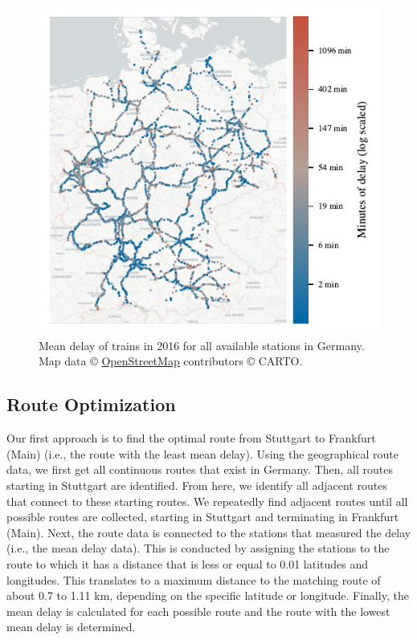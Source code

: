 \documentclass{article}
\theoremstyle{plain}
\theoremstyle{definition}
\theoremstyle{remark}
\begin{document}
	\begin{figure} %
		\begin{center}
			\includegraphics{./fig/maps_KI_01_all_data_cmap.pdf} %
		\end{center}
		\caption{Mean delay of trains in 2016 for all available stations in Germany. Map data © \href{https://www.openstreetmap.org/}{OpenStreetMap} contributors © CARTO.}
		\label{all_data_cmap}
	\end{figure}
	
	\subsection{Route Optimization}\label{sec:methods_route}
	
	Our first approach is to find the optimal route from Stuttgart to Frankfurt (Main) (i.e., the route with the least mean delay). Using the geographical route data, we first get all continuous routes that exist in Germany. Then, all routes starting in Stuttgart are identified. From here, we identify all adjacent routes that connect to these starting routes. We repeatedly find adjacent routes until all possible routes are collected, starting in Stuttgart and terminating in Frankfurt (Main). Next, the route data is connected to the stations that measured the delay (i.e., the mean delay data). This is conducted by assigning the stations to the route to which it has a distance that is less or equal to 0.01 latitudes and longitudes. This translates to a maximum distance to the matching route of about 0.7 to 1.11 km, depending on the specific latitude or longitude. Finally, the mean delay is calculated for each possible route and the route with the lowest mean delay is determined.
	
\end{document}
